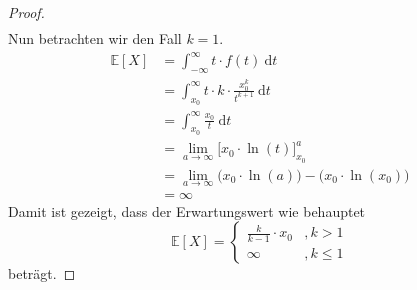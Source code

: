 \documentclass[a4paper]{scrartcl}
\newcommand{\dif}{\ \mathrm{d}}
\newcommand{\e}{\mathbb{E}}
\def \blattnr {11}
\begin{document}
\begin{enumerate}[label=\bfseries \blattnr.\arabic*]
\begin{enumerate}
\begin{proof}
\begin{equation*}
\begin{split}
                        \end{split}
                    \end{equation*}
                    Nun betrachten wir den Fall $k = 1$.
                    \begin{equation*}
                        \begin{split}
                            \e[X]
                            &= \int_{-\infty}^\infty t \cdot f(t) \dif t \\
                            &= \int_{x_0}^\infty t \cdot k \cdot \frac{x_0^k}{t^{k+1}} \dif t \\
                            &= \int_{x_0}^\infty \frac{x_0}{t} \dif t \\
                            &= \lim_{a \to \infty} \Big[ x_0 \cdot \ln(t) \Big]_{x_0}^a \\
                            &= \lim_{a \to \infty} \Big( x_0 \cdot \ln(a) \Big) - \Big( x_0 \cdot \ln(x_0) \Big) \\
                            &= \infty
                        \end{split}
                    \end{equation*}
                    Damit ist gezeigt, dass der Erwartungswert wie behauptet
                    \begin{equation*}
                        \e[X] = \begin{cases}
                            \frac{k}{k-1} \cdot x_0 &, k>1 \\
                            \infty &, k\leq 1
                        \end{cases}
                    \end{equation*}
                    beträgt.
                \end{proof}

        \end{enumerate}
\end{enumerate}
\end{document}

